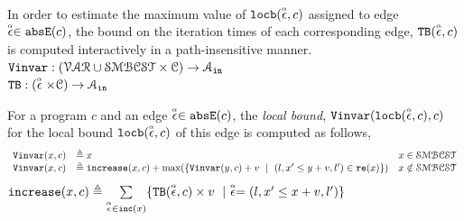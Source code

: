 \begin{enumerate}
\\
In order to estimate the maximum value of $\locbound(\absevent, c)$ assigned to edge $\absevent \in \absE(c)$,
the bound on the iteration times of each corresponding edge, $\absclr(\absevent, c)$ 
is computed interactively in a path-insensitive manner.
\\ 
$ \varinvar: (\mathcal{VAR} \cup \constdom  \times \cdom) \to \mathcal{A}_{\lin}$
\\
$\absclr: (\absevent \times \cdom) \to \mathcal{A}_{\lin}$
\begin{defn}
  \label{def:ranking_bound}
For a program $c$ and an edge $\absevent \in \absE(c)$,
the \emph{local bound}, $\varinvar(\locbound(\absevent, c), c)$ for the local bound $\locbound(\absevent, c)$
of this edge
is computed as follows,
  \[ 
\begin{array}{lll}
  \varinvar(x, c) & \triangleq x & x \in \constdom \\
  \varinvar(x, c) & \triangleq \incrs(x, c) + 
  \max(\{\varinvar(y, c) + v ~\mid~ (l, x' \leq y + v, l') \in \reset(x)\}) & x \notin \constdom
\end{array}
\]
%
$\incrs(x, c) \triangleq \sum\limits_{\absevent \in \inc(x)}\{\absclr(\absevent, c) \times v ~\mid~ 
\absevent = (l, x' \leq x + v, l')\}$
\end{defn}
%

\end{enumerate}
